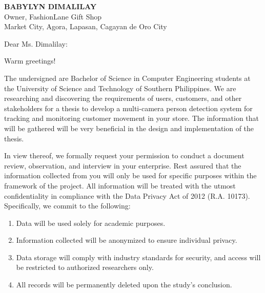 \noindent \textbf{BABYLYN DIMALILAY}\\
Owner, FashionLane Gift Shop\\
Market City, Agora, Lapasan, Cagayan de Oro City

\vspace{8pt}

\noindent Dear Ms. Dimalilay:

\vspace{6pt}

\noindent Warm greetings!

\vspace{4pt}

\noindent The undersigned are Bachelor of Science in Computer Engineering students at the University of Science and Technology of Southern Philippines. We are researching and discovering the requirements of users, customers, and other stakeholders for a thesis to develop a multi-camera person detection system for tracking and monitoring customer movement in your store. The information that will be gathered will be very beneficial in the design and implementation of the thesis.

\vspace{4pt}

\noindent In view thereof, we formally request your permission to conduct a document review, observation, and interview in your enterprise. Rest assured that the information collected from you will only be used for specific purposes within the framework of the project. All information will be treated with the utmost confidentiality in compliance with the Data Privacy Act of 2012 (R.A. 10173). Specifically, we commit to the following:

\vspace{4pt}

\begin{enumerate}
	\setlength{\itemsep}{0pt}
	\setlength{\parskip}{0pt}
	\item Data will be used solely for academic purposes.
	\item Information collected will be anonymized to ensure individual privacy.
	\item Data storage will comply with industry standards for security, and access will be restricted to authorized researchers only.
	\item All records will be permanently deleted upon the study's conclusion.
\end{enumerate}

\vspace{4pt}

